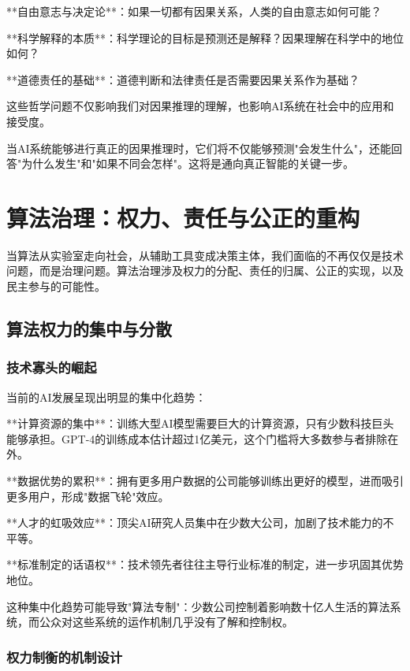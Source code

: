**自由意志与决定论**：如果一切都有因果关系，人类的自由意志如何可能？

**科学解释的本质**：科学理论的目标是预测还是解释？因果理解在科学中的地位如何？

**道德责任的基础**：道德判断和法律责任是否需要因果关系作为基础？

这些哲学问题不仅影响我们对因果推理的理解，也影响AI系统在社会中的应用和接受度。

当AI系统能够进行真正的因果推理时，它们将不仅能够预测"会发生什么"，还能回答"为什么发生"和"如果不同会怎样"。这将是通向真正智能的关键一步。

\section{算法治理：权力、责任与公正的重构}

当算法从实验室走向社会，从辅助工具变成决策主体，我们面临的不再仅仅是技术问题，而是治理问题。算法治理涉及权力的分配、责任的归属、公正的实现，以及民主参与的可能性。

\subsection{算法权力的集中与分散}

\subsubsection{技术寡头的崛起}

当前的AI发展呈现出明显的集中化趋势：

**计算资源的集中**：训练大型AI模型需要巨大的计算资源，只有少数科技巨头能够承担。GPT-4的训练成本估计超过1亿美元，这个门槛将大多数参与者排除在外。

**数据优势的累积**：拥有更多用户数据的公司能够训练出更好的模型，进而吸引更多用户，形成"数据飞轮"效应。

**人才的虹吸效应**：顶尖AI研究人员集中在少数大公司，加剧了技术能力的不平等。

**标准制定的话语权**：技术领先者往往主导行业标准的制定，进一步巩固其优势地位。

\begin{center}
这种集中化趋势可能导致"算法专制"：少数公司控制着影响数十亿人生活的算法系统，而公众对这些系统的运作机制几乎没有了解和控制权。
\end{center}

\subsubsection{权力制衡的机制设计}


